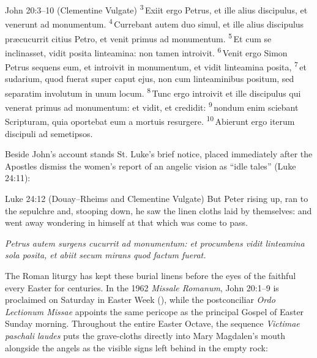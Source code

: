 \begin{massbox}{John 20:3--10 (Clementine Vulgate)}
\textsuperscript{3}\,Exiit ergo Petrus, et ille alius discipulus, et venerunt ad monumentum.
\textsuperscript{4}\,Currebant autem duo simul, et ille alius discipulus pr\ae{}cucurrit citius Petro, et venit primus ad monumentum.
\textsuperscript{5}\,Et cum se inclinasset, vidit posita linteamina: non tamen introivit.
\textsuperscript{6}\,Venit ergo Simon Petrus sequens eum, et introivit in monumentum, et vidit linteamina posita,
\textsuperscript{7}\,et sudarium, quod fuerat super caput ejus, non cum linteaminibus positum, sed separatim involutum in unum locum.
\textsuperscript{8}\,Tunc ergo introivit et ille discipulus qui venerat primus ad monumentum: et vidit, et credidit:
\textsuperscript{9}\,nondum enim sciebant Scripturam, quia oportebat eum a mortuis resurgere.
\textsuperscript{10}\,Abierunt ergo iterum discipuli ad semetipsos.
\end{massbox}

Beside John's account stands St. Luke's brief notice, placed immediately after the Apostles dismiss the women's report of an angelic vision as ``idle tales'' (Luke 24:11):

\begin{massbox}{Luke 24:12 (Douay--Rheims and Clementine Vulgate)}
But Peter rising up, ran to the sepulchre and, stooping down, he saw the linen cloths laid by themselves: and went away wondering in himself at that which was come to pass.

\medskip
\emph{Petrus autem surgens cucurrit ad monumentum: et procumbens vidit linteamina sola posita, et abiit secum mirans quod factum fuerat.}
\end{massbox}

The Roman liturgy has kept these burial linens before the eyes of the faithful every Easter for centuries. In the 1962 \emph{Missale Romanum}, John 20:1--9 is proclaimed on Saturday in Easter Week (), while the postconciliar \emph{Ordo Lectionum Missae} appoints the same pericope as the principal Gospel of Easter Sunday morning. Throughout the entire Easter Octave, the sequence \emph{Victimae paschali laudes} puts the grave-cloths directly into Mary Magdalen's mouth alongside the angels as the visible signs left behind in the empty rock:


